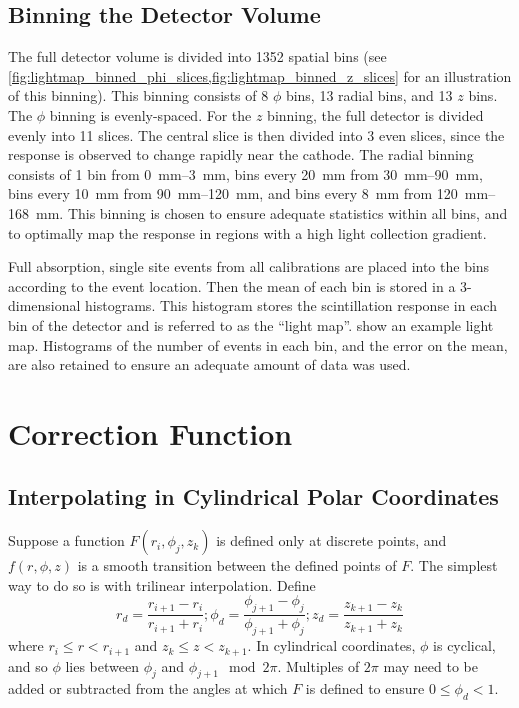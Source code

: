 \documentclass[herrin-thesis.tex]{subfiles}
\begin{document}
\subsection{Binning the Detector Volume}

The full detector volume is divided into 1352 spatial bins (see \cref{fig:lightmap_binned_phi_slices,fig:lightmap_binned_z_slices} for an illustration of this binning). This binning consists of 8 \(\phi\) bins, 13 radial bins, and 13 \(z\) bins. The \(\phi\) binning is evenly-spaced. For the \(z\) binning, the full detector is divided evenly into 11 slices. The central slice is then divided into 3 even slices, since the response is observed to change rapidly near the cathode. The radial binning consists of 1 bin from \SIrange{0}{3}{\mm}, bins every \SI{20}{mm} from \SIrange{30}{90}{\mm}, bins every \SI{10}{\mm} from \SIrange{90}{120}{\mm}, and bins every \SI{8}{mm} from \SIrange{120}{168}{\mm}. This binning is chosen to ensure adequate statistics within all bins, and to optimally map the response in regions with a high light collection gradient.

Full absorption, single site events from all calibrations are placed into the bins according to the event location. Then the mean of each bin is stored in a 3-dimensional histograms. This histogram stores the scintillation response in each bin of the detector and is referred to as the ``light map''.  show an example light map. Histograms of the number of events in each bin, and the error on the mean, are also retained to ensure an adequate amount of data was used.

\section{Correction Function}

\subsection{Interpolating in Cylindrical Polar Coordinates}
Suppose a function \(F(r_i, \phi_j, z_k)\) is defined only at discrete points, and \(f(r, \phi, z)\) is a smooth transition between the defined points of \(F\). The simplest way to do so is with trilinear interpolation. Define
\begin{equation}
r_d = \frac{r_{i+1} - r_{i}}{r_{i+1}+r_{i}} ; \phi_d = \frac{\phi_{j+1} - \phi_{j}}{\phi_{j+1}+\phi_{j}}; z_d = \frac{z_{k+1} - z_{k}}{z_{k+1}+z_{k}}
\label{eq:lightmap_interpolation_weights}
\end{equation}
where \(r_i \leq r < r_{i+1}\) and \(z_k \leq z < z_{k+1}\). In cylindrical coordinates, \(\phi\) is cyclical, and so \(\phi\) lies between \(\phi_j\) and \(\phi_{j+1} \mod 2\pi\). Multiples of \(2\pi\) may need to be added or subtracted from the angles at which \(F\) is defined to ensure \(0 \leq \phi_d < 1\).
\end{document}
